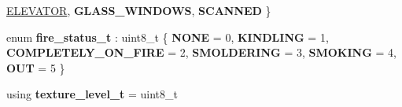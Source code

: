 \begin{DoxyCompactItemize}
\hyperlink{structroom__data_a9552b46091ee649079e41f04f9543b8ea73dc5c708ccbd44132d03b2ebe7db7c5}{E\+L\+E\+V\+A\+T\+OR}, 
{\bfseries G\+L\+A\+S\+S\+\_\+\+W\+I\+N\+D\+O\+WS}, 
{\bfseries S\+C\+A\+N\+N\+ED}
 \}
\item 
\mbox{\label{structroom__data_aad8501e5aeeaa48dd1ac944d62cf06cb}} 
enum {\bfseries fire\+\_\+status\+\_\+t} \+: uint8\+\_\+t \{ \newline
{\bfseries N\+O\+NE} = 0, 
{\bfseries K\+I\+N\+D\+L\+I\+NG} = 1, 
{\bfseries C\+O\+M\+P\+L\+E\+T\+E\+L\+Y\+\_\+\+O\+N\+\_\+\+F\+I\+RE} = 2, 
{\bfseries S\+M\+O\+L\+D\+E\+R\+I\+NG} = 3, 
\newline
{\bfseries S\+M\+O\+K\+I\+NG} = 4, 
{\bfseries O\+UT} = 5
 \}
\item 
\mbox{\label{structroom__data_a1c9d12fd8be2e38c8f4f13be1fa245e6}} 
using {\bfseries texture\+\_\+level\+\_\+t} = uint8\+\_\+t
\end{DoxyCompactItemize}
